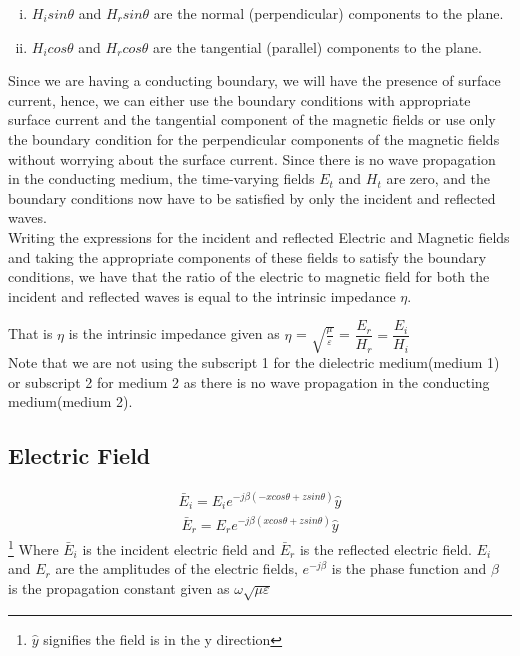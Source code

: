 \begin{enumerate}[(i)]
\item $ H_isin\theta $ and $ H_rsin\theta $  are the normal (perpendicular) components to the plane.
\item $ H_icos\theta $ and $ H_rcos\theta $ are the tangential (parallel) components to the plane.
\end{enumerate}
Since we are having a conducting boundary, we will have the presence of surface current, hence, we can either use the boundary conditions with appropriate surface current and the tangential component of the magnetic fields or use only the boundary condition for the perpendicular components of the magnetic fields without worrying about the surface current. Since there is no wave propagation in the conducting medium, the time-varying fields $E_t$ and $H_t$ are zero, and the boundary conditions now have to be satisfied by only the incident and reflected waves.\\ 
Writing the expressions for the incident and reflected Electric and Magnetic fields and taking the appropriate components of these fields
to satisfy the boundary conditions, we have that the ratio of the electric to magnetic field for both the incident and reflected waves is equal to the intrinsic impedance $\eta $.

That is $ \eta $ is the intrinsic impedance given as $\eta $ = $\sqrt{\frac{\mu}{\varepsilon}}$ = $\dfrac{E_r}{H_r} = \dfrac{E_i}{H_i}$\\

Note that we are not using the subscript 1 for the dielectric medium(medium 1) or subscript 2 for medium 2 as there is no wave propagation in the conducting medium(medium 2).
\subsection{Electric Field}
\begin{align}
\bar{E}_i = E_i e^{-j\beta(-xcos\theta + zsin\theta)} \hat{y}
\label{eqn:elecincid}
\end{align}
\begin{align}
\bar{E}_r =E_r  e^{-j\beta ( xcos\theta + zsin\theta)} \hat{y}
\label{eqn:elecref}
\end{align}\footnote{$\hat{y}$ signifies the field is in the y direction}
Where $\bar{E}_i$ is the incident electric field and $\bar{E}_r$ is the reflected electric field. $E_i$ and $E_r$ are the amplitudes of the electric fields, $e^{-j\beta}$ is the phase function and $\beta$ is the propagation constant given as $\omega \sqrt{\mu\varepsilon}$ 

